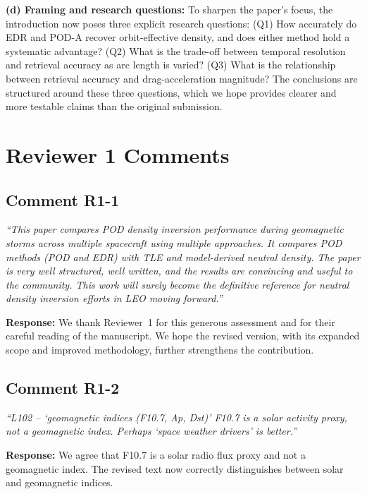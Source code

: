 \documentclass[11pt]{article}
\newcommand{\reviewercomment}[1]{%
  \medskip
  \noindent\textit{\color{reviewblue}#1}%
  \medskip
}
\begin{document}
\textbf{(d) Framing and research questions:} To sharpen the paper's focus, the introduction now poses three explicit research questions: (Q1) How accurately do EDR and POD-A recover orbit-effective density, and does either method hold a systematic advantage? (Q2) What is the trade-off between temporal resolution and retrieval accuracy as arc length is varied? (Q3) What is the relationship between retrieval accuracy and drag-acceleration magnitude? The conclusions are structured around these three questions, which we hope provides clearer and more testable claims than the original submission.


\section{Reviewer 1 Comments}

\subsection{Comment R1-1}

\reviewercomment{%
``This paper compares POD density inversion performance during geomagnetic storms across multiple spacecraft using multiple approaches. It compares POD methods (POD and EDR) with TLE and model-derived neutral density. The paper is very well structured, well written, and the results are convincing and useful to the community. This work will surely become the definitive reference for neutral density inversion efforts in LEO moving forward.''}

\textbf{Response:}
We thank Reviewer~1 for this generous assessment and for their careful reading of the manuscript. We hope the revised version, with its expanded scope and improved methodology, further strengthens the contribution.


\subsection{Comment R1-2}

\reviewercomment{%
``L102 -- `geomagnetic indices (F10.7, Ap, Dst)' F10.7 is a solar activity proxy, not a geomagnetic index. Perhaps `space weather drivers' is better.''}

\textbf{Response:}
We agree that F10.7 is a solar radio flux proxy and not a geomagnetic index. The revised text now correctly distinguishes between solar and geomagnetic indices.
\end{document}
